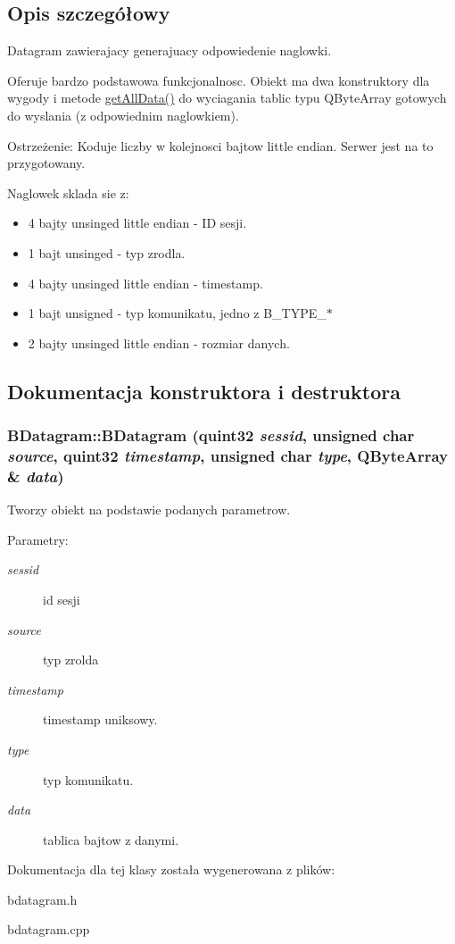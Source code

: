 \subsection{Opis szczegółowy}
Datagram zawierajacy generajuacy odpowiedenie naglowki. 

Oferuje bardzo podstawowa funkcjonalnosc. Obiekt ma dwa konstruktory dla wygody i metode \hyperlink{class_b_datagram_bf97808c5ae33d46feb4e2f1a920cb4f}{getAllData()} do wyciagania tablic typu QByteArray gotowych do wyslania (z odpowiednim naglowkiem).

\begin{Desc}
\item[Ostrzeżenie:]Koduje liczby w kolejnosci bajtow little endian. Serwer jest na to przygotowany.\end{Desc}
Naglowek sklada sie z: \begin{itemize}
\item 4 bajty unsinged little endian - ID sesji. \item 1 bajt unsinged - typ zrodla. \item 4 bajty unsinged little endian - timestamp. \item 1 bajt unsigned - typ komunikatu, jedno z B\_\-TYPE\_\-$\ast$ \item 2 bajty unsinged little endian - rozmiar danych. \end{itemize}


\subsection{Dokumentacja konstruktora i destruktora}
\hypertarget{class_b_datagram_6a687551e97a36b91c6a40a1c5a374ed}{
\subsubsection[{BDatagram}]{\setlength{\rightskip}{0pt plus 5cm}BDatagram::BDatagram (quint32 {\em sessid}, \/  unsigned char {\em source}, \/  quint32 {\em timestamp}, \/  unsigned char {\em type}, \/  QByteArray \& {\em data})}}
\label{class_b_datagram_6a687551e97a36b91c6a40a1c5a374ed}


Tworzy obiekt na podstawie podanych parametrow. 

\begin{Desc}
\item[Parametry:]
\begin{description}
\item[{\em sessid}]id sesji \item[{\em source}]typ zrolda \item[{\em timestamp}]timestamp uniksowy. \item[{\em type}]typ komunikatu. \item[{\em data}]tablica bajtow z danymi. \end{description}
\end{Desc}


Dokumentacja dla tej klasy została wygenerowana z plików:\begin{CompactItemize}
\item 
bdatagram.h\item 
bdatagram.cpp\end{CompactItemize}
